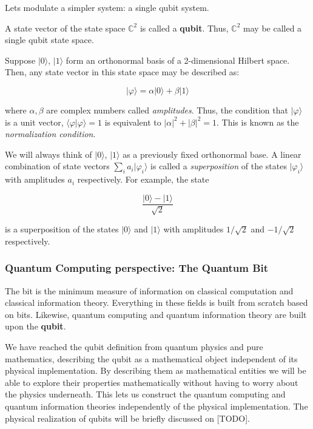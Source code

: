 \documentclass{article}
\begin{document}
	Lets modulate a simpler system: a single qubit system.
	
	\begin{definition}
		A state vector of the state space $\mathds{C}^{2}$ is called a \textbf{qubit}. Thus, $\mathds{C}^{2}$ may be called a single qubit state space.
	\end{definition}
	
	Suppose $|0\rangle$, $|1\rangle$ form an orthonormal basis of a 2-dimensional Hilbert space. Then, any state vector in this state space may be described as:
	
	$$ |\varphi\rangle = \alpha|0\rangle + \beta|1\rangle $$
	
	where $\alpha,\beta$ are complex numbers called \emph{amplitudes}. Thus, the condition that $|\varphi\rangle$ is a unit vector, $\langle\varphi|\varphi\rangle = 1$ is equivalent to $|\alpha|^2 + |\beta|^2 = 1$. This is known as the \emph{normalization condition}.
	
	We will always think of $|0\rangle$, $|1\rangle$ as a previously fixed orthonormal base. A linear combination of state vectors $\sum_i a_i |\varphi_i\rangle$ is called a \emph{superposition} of the states $|\varphi_i\rangle$ with amplitudes $a_i$ respectively. For example, the state
	
	$$ \frac{|0\rangle - |1\rangle}{\sqrt 2} $$
	
	is a superposition of the states $|0\rangle$ and $|1\rangle$ with amplitudes $1/\sqrt 2$ and $-1/\sqrt 2$ respectively.
	
	
	\subsubsection{Quantum Computing perspective: The Quantum Bit}
	
	
	The bit is the minimum measure of information on classical computation and classical information theory. Everything in these fields is built from scratch based on bits. Likewise, quantum computing and quantum information theory are built upon the \textbf{qubit}.
	
	We have reached the qubit definition from quantum physics and pure mathematics, describing the qubit as a mathematical object independent of its physical implementation. By describing them as mathematical entities we will be able to explore their properties mathematically without having to worry about the physics underneath. This lets us construct the quantum computing and quantum information theories independently of the physical implementation. The physical realization of qubits will be briefly discussed on [TODO].
	
\end{document}

